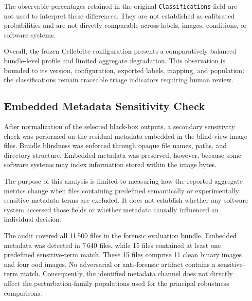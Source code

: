 The observable percentages retained in the original
\texttt{Classifications} field are not used to interpret these differences.
They are not established as calibrated probabilities and are not directly
comparable across labels, images, conditions, or software systems.

Overall, the frozen Cellebrite configuration presents a comparatively balanced
bundle-level profile and limited aggregate degradation. This observation is
bounded to its version, configuration, exported labels, mapping, and population;
the classifications remain traceable triage indicators requiring human review.






\subsection{Embedded Metadata Sensitivity Check}
\label{subsec:results-embedded-metadata-sensitivity}

After normalization of the selected black-box outputs, a secondary sensitivity
check was performed on the residual metadata embedded in the blind-view image
files. Bundle blindness was enforced through opaque file names, paths, and
directory structure. Embedded metadata was preserved, however, because some
software systems may index information stored within the image bytes.

The purpose of this analysis is limited to measuring how the reported aggregate
metrics change when files containing predefined semantically or experimentally
sensitive metadata terms are excluded. It does not establish whether any
software system accessed those fields or whether metadata causally influenced
an individual decision.

The audit covered all 11\,500 files in the forensic evaluation bundle. Embedded
metadata was detected in 7\,640 files, while 15 files contained at least one
predefined sensitive-term match. These 15 files comprise 11 clean binary images
and four \gls{ood} images. No adversarial or anti-forensic artifact contains a
sensitive-term match. Consequently, the identified metadata channel does not
directly affect the perturbation-family populations used for the principal
robustness comparisons.

